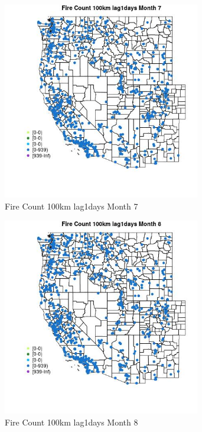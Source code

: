 \begin{figure} 
\centering  
\includegraphics[width=0.77\textwidth]{Code_Outputs/Report_ML_input_PM25_Step4_part_e_de_duplicated_aves_compiled_2019-05-21wNAs_MapObsMo7Fire_Count_100km_lag1days.jpg} 
\caption{\label{fig:Report_ML_input_PM25_Step4_part_e_de_duplicated_aves_compiled_2019-05-21wNAsMapObsMo7Fire_Count_100km_lag1days}Fire Count 100km lag1days Month 7} 
\end{figure} 
 

\begin{figure} 
\centering  
\includegraphics[width=0.77\textwidth]{Code_Outputs/Report_ML_input_PM25_Step4_part_e_de_duplicated_aves_compiled_2019-05-21wNAs_MapObsMo8Fire_Count_100km_lag1days.jpg} 
\caption{\label{fig:Report_ML_input_PM25_Step4_part_e_de_duplicated_aves_compiled_2019-05-21wNAsMapObsMo8Fire_Count_100km_lag1days}Fire Count 100km lag1days Month 8} 
\end{figure} 
 

